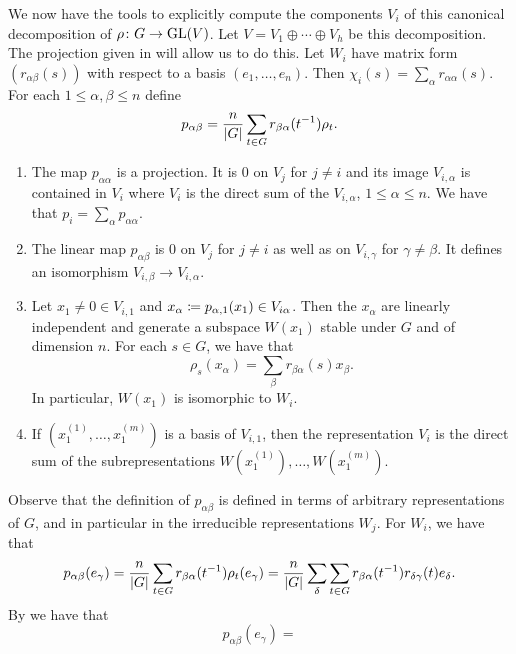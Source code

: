 \documentclass[letterpaper, 11pt, oneside]{book}
\begin{document}
We now have the tools to explicitly compute the components $V_{i}$ of this canonical decomposition of $\rho\colon G \to \operatorname{GL}(V)$.
Let $V = V_{1} \oplus \cdots \oplus V_{h}$ be this decomposition.
The projection given in  will allow us to do this.
Let $W_{i}$ have matrix form $(r_{\alpha \beta}(s))$ with respect to a basis $(e_{1}, \ldots, e_{n})$.
Then $\chi_{i}(s) = \sum_{\alpha} r_{\alpha \alpha}(s)$.
For each $1 \leq \alpha, \beta \leq n$ define
\[
  p_{\alpha \beta} = \frac{n}{\abs{G}} \sum_{t \in G} r_{\beta \alpha}(t^{-1}) \rho_{t}.
\]
\begin{prop}
  \begin{enumerate}\
  \item The map $p_{\alpha \alpha}$ is a projection.
        It is $0$ on $V_{j}$ for $j \neq i$ and its image $V_{i, \alpha}$ is contained in $V_{i}$ where $V_{i}$ is the direct sum of the $V_{i, \alpha}$, $1 \leq \alpha \leq n$.
        We have that $p_{i} = \sum_{\alpha} p_{\alpha \alpha}$.
  \item The linear map $p_{\alpha \beta}$ is $0$ on $V_{j}$ for $j \neq i$ as well as on $V_{i, \gamma}$ for $\gamma \neq \beta$.
        It defines an isomorphism $V_{i, \beta} \to V_{i, \alpha}$.
  \item Let $x_{1} \neq 0 \in V_{i, 1}$ and $x_{\alpha} \coloneqq p_{\alpha, 1}(x_{1}) \in V_{i \alpha}$.
        Then the $x_{\alpha}$ are linearly independent and generate a subspace $W(x_{1})$ stable under $G$ and of dimension $n$.
        For each $s \in G$, we have that
        \[
          \rho_{s}(x_{\alpha}) = \sum_{\beta} r_{\beta \alpha}(s) x_{\beta}.
        \]
        In particular, $W(x_{1})$ is isomorphic to $W_{i}$.
  \item If $(x_{1}^{(1)}, \ldots, x_{1}^{(m)})$ is a basis of $V_{i, 1}$, then the representation $V_{i}$ is the direct sum of the subrepresentations $W(x_{1}^{(1)}), \ldots, W(x_{1}^{(m)})$.
  \end{enumerate}
  \begin{pf}
    Observe that the definition of $p_{\alpha \beta}$ is defined in terms of arbitrary representations of $G$, and in particular in the irreducible representations $W_{j}$.
    For $W_{i}$, we have that
    \[
      p_{\alpha \beta}(e_{\gamma}) = \frac{n}{\abs{G}} \sum_{t \in G} r_{\beta \alpha}(t^{-1}) \rho_{t}(e_{\gamma}) = \frac{n}{\abs{G}} \sum_{\delta} \sum_{t \in G} r_{\beta \alpha}(t^{-1})r_{\delta \gamma}(t)e_{\delta}.
    \]
    By  we have that
    \[
      p_{\alpha \beta}(e_{\gamma}) =
\]
\end{pf}
\end{prop}
\end{document}
